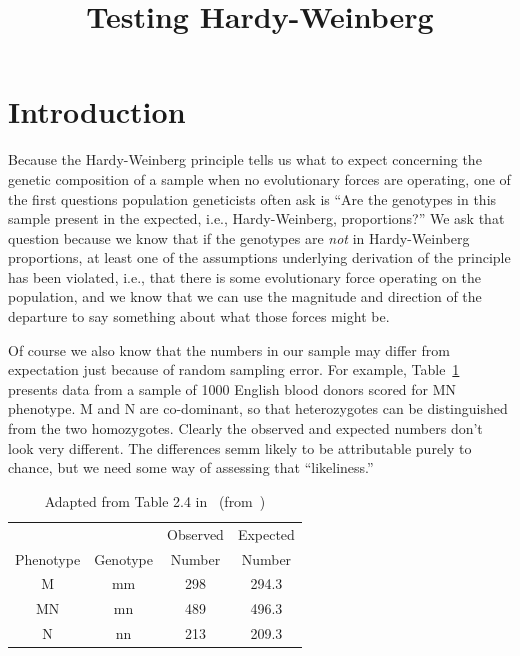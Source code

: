 \documentclass[12pt]{article}
\title{Testing Hardy-Weinberg}
\begin{document}
\maketitle

\thispagestyle{first}

\section*{Introduction}

Because the Hardy-Weinberg principle tells us what to expect
concerning the genetic composition of a sample when no evolutionary
forces are operating, one of the first questions population
geneticists often ask is ``Are the genotypes in this sample present in
the expected, i.e., Hardy-Weinberg, proportions?'' We ask that
question because we know that if the genotypes are {\it not\/} in
Hardy-Weinberg proportions, at least one of the assumptions underlying
derivation of the principle has been violated, i.e., that there is
some evolutionary force operating on the population, and we know that
we can use the magnitude and direction of the departure to say
something about what those forces might be.

Of course we also know that the numbers in our sample may differ from
expectation just because of random sampling error. For example,
Table~\ref{table:MN-data} presents data from a sample of 1000 English
blood donors scored for MN phenotype. M and N are co-dominant, so that
heterozygotes can be distinguished from the two homozygotes. Clearly
the observed and expected numbers don't look very different. The
differences semm likely to be attributable purely to chance, but we
need some way of assessing that ``likeliness.''

\begin{table}
\begin{center}
\begin{tabular}{cccc}
\hline\hline
          &          & Observed & Expected \\
Phenotype & Genotype & Number   & Number   \\
\hline
M         & mm       & 298      & 294.3 \\
MN        & mn       & 489      & 496.3 \\
N         & nn       & 213      & 209.3 \\
\hline
\end{tabular}
\end{center}
\caption{Adapted from Table 2.4 in~\cite{Hedrick-2000}
  (from~\cite{Cleghorn-1960})}\label{table:MN-data} 
\end{table}
\end{document}
